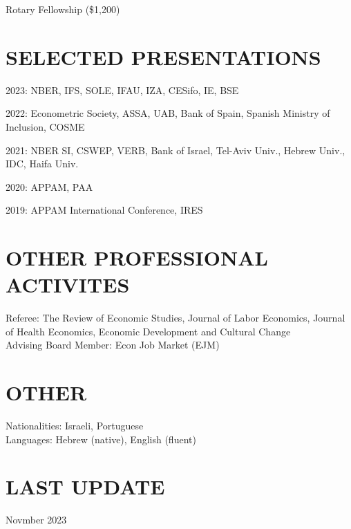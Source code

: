 \documentclass[margin]{res} %
\begin{document}
\begin{resume}
		 Rotary Fellowship (\$1,200) 


 
\section{SELECTED PRESENTATIONS} 
\vspace{2em}

 2023: NBER, IFS, SOLE, IFAU, IZA, CESifo, IE, BSE

 2022: Econometric Society, ASSA, UAB, Bank of Spain, Spanish Ministry of Inclusion, COSME

 2021: NBER SI, CSWEP, VERB, Bank of Israel, Tel-Aviv Univ., Hebrew Univ., IDC, Haifa Univ.

 2020: APPAM, PAA

 2019: APPAM International Conference, IRES

\section{OTHER PROFESSIONAL ACTIVITES} 

Referee: The Review of Economic Studies, Journal of Labor Economics, Journal of Health Economics, Economic Development and Cultural Change
\\
Advising Board Member: Econ Job Market (EJM)
\section{OTHER} 
Nationalities: Israeli, Portuguese \\
Languages: Hebrew (native), English (fluent) \\

\section{LAST UPDATE} 
Novmber 2023

\end{resume}
\end{document}
